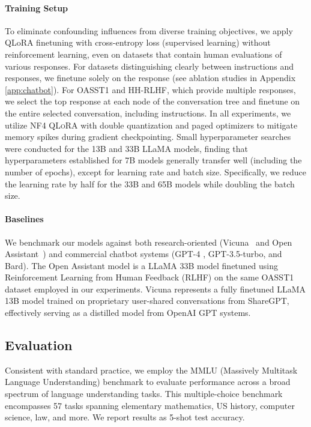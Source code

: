 \paragraph{Training Setup} To eliminate confounding influences from diverse training objectives, we apply QLoRA finetuning with cross-entropy loss (supervised learning) without reinforcement learning, even on datasets that contain human evaluations of various responses. For datasets distinguishing clearly between instructions and responses, we finetune solely on the response (see ablation studies in Appendix \ref{app:chatbot}). For OASST1 and HH-RLHF, which provide multiple responses, we select the top response at each node of the conversation tree and finetune on the entire selected conversation, including instructions. In all experiments, we utilize NF4 \textsc{QLoRA} with double quantization and paged optimizers to mitigate memory spikes during gradient checkpointing. Small hyperparameter searches were conducted for the 13B and 33B LLaMA models, finding that hyperparameters established for 7B models generally transfer well (including the number of epochs), except for learning rate and batch size. Specifically, we reduce the learning rate by half for the 33B and 65B models while doubling the batch size.

\paragraph{Baselines} We benchmark our models against both research-oriented (Vicuna~\citep{vicuna2023} and Open Assistant~\citep{kopf2023openassistant}) and commercial chatbot systems (GPT-4 \citep{openai2023gpt}, GPT-3.5-turbo, and Bard). The Open Assistant model is a LLaMA 33B model finetuned using Reinforcement Learning from Human Feedback (RLHF) on the same OASST1 dataset employed in our experiments. Vicuna represents a fully finetuned LLaMA 13B model trained on proprietary user-shared conversations from ShareGPT, effectively serving as a distilled model from OpenAI GPT systems.

\subsection{Evaluation}

Consistent with standard practice, we employ the MMLU (Massively Multitask Language Understanding) benchmark \citep{hendrycksmeasuring} to evaluate performance across a broad spectrum of language understanding tasks. This multiple-choice benchmark encompasses 57 tasks spanning elementary mathematics, US history, computer science, law, and more. We report results as 5-shot test accuracy.

